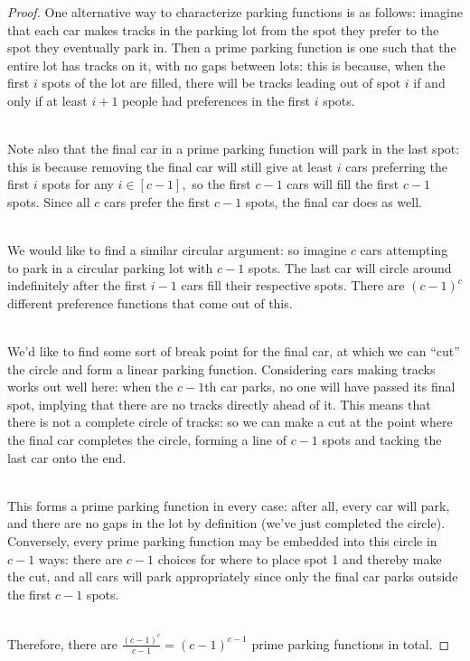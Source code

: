 \begin{proof}
    One alternative way to characterize parking functions is as follows: imagine that each car makes tracks in the parking lot from the spot they prefer to the spot they eventually park in. Then a prime parking function is one such that the entire lot has tracks on it, with no gaps between lots: this is because, when the first $i$ spots of the lot are filled, there will be tracks leading out of spot $i$ if and only if at least $i+1$ people had preferences in the first $i$ spots.\\~

    Note also that the final car in a prime parking function will park in the last spot: this is because removing the final car will still give at least $i$ cars preferring the first $i$ spots for any $i\in[c-1],$ so the first $c-1$ cars will fill the first $c-1$ spots. Since all $c$ cars prefer the first $c-1$ spots, the final car does as well.\\~

    We would like to find a similar circular argument: so imagine $c$ cars attempting to park in a circular parking lot with $c-1$ spots. The last car will circle around indefinitely after the first $i-1$ cars fill their respective spots. There are $(c-1)^c$ different preference functions that come out of this.\\~
    
    We'd like to find some sort of break point for the final car, at which we can ``cut'' the circle and form a linear parking function. Considering cars making tracks works out well here: when the $c-1$th car parks, no one will have passed its final spot, implying that there are no tracks directly ahead of it. This means that there is not a complete circle of tracks: so we can make a cut at the point where the final car completes the circle, forming a line of $c-1$ spots and tacking the last car onto the end.\\~

    This forms a prime parking function in every case: after all, every car will park, and there are no gaps in the lot by definition (we've just completed the circle). Conversely, every prime parking function may be embedded into this circle in $c-1$ ways: there are $c-1$ choices for where to place spot 1 and thereby make the cut, and all cars will park appropriately since only the final car parks outside the first $c-1$ spots.\\~

    Therefore, there are $\frac{(c-1)^c}{c-1}=(c-1)^{c-1}$ prime parking functions in total.
\end{proof}

